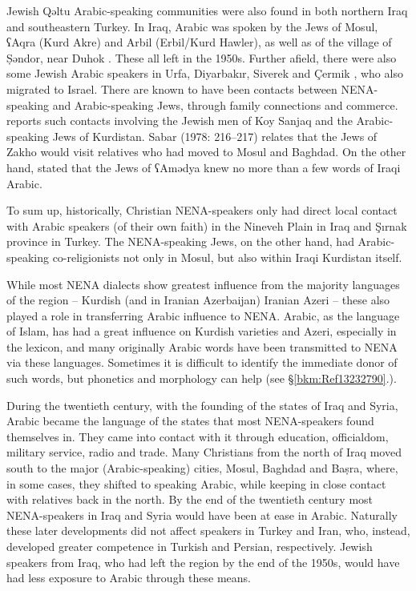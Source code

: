 \documentclass[output=paper]{langsci/langscibook}
\begin{document}
Jewish Qəltu Arabic-speaking communities were also found in both northern Iraq and southeastern Turkey. In Iraq, Arabic was spoken by the Jews of Mosul, ʕAqra (Kurd Akre) and Arbil (Erbil/Kurd Hawler), as well as of the village of Ṣəndor, near Duhok \citep[9]{Hoberman1989}. These all left in the 1950s. Further afield, there were also some Jewish Arabic speakers in Urfa, Diyarbakır, Siverek and Çermik \citep[4]{Jastrow1978}, who also migrated to Israel. There are known to have been contacts between NENA-speaking and Arabic-speaking Jews, through family connections and commerce. \citet[6]{Mutzafi2004} reports such contacts involving the Jewish men of Koy Sanjaq and the Arabic-speaking Jews of Kurdistan. Sabar (1978: 216–217) relates that the Jews of Zakho would visit relatives who had moved to Mosul and Baghdad. On the other hand, \citet[9]{Hoberman1989} stated that the Jews of ʕAmədya knew no more than a few words of Iraqi Arabic.

To sum up, historically, Christian NENA-speakers only had direct local contact with Arabic speakers (of their own faith) in the Nineveh Plain in Iraq and Şırnak province in Turkey. The NENA-speaking Jews, on the other hand, had Arabic-speaking co-religionists not only in Mosul, but also within Iraqi Kurdistan itself.

While most NENA dialects show greatest influence from the majority languages of the region – Kurdish (and in Iranian Azerbaijan) Iranian Azeri – these also played a role in transferring Arabic influence to NENA. Arabic, as the language of Islam, has had a great influence on Kurdish varieties and Azeri, especially in the lexicon, and many originally Arabic words have been transmitted to NENA via these languages. Sometimes it is difficult to identify the immediate donor of such words, but phonetics and morphology can help (see §\ref{bkm:Ref13232790}.).

During the twentieth century, with the founding of the states of Iraq and Syria, Arabic became the language of the states that most NENA-speakers found themselves in. They came into contact with it through education, officialdom, military service, radio and trade. Many Christians from the north of Iraq moved south to the major (Arabic-speaking) cities, Mosul, Baghdad and Baṣra, where, in some cases, they shifted to speaking Arabic, while keeping in close contact with relatives back in the north. By the end of the twentieth century most NENA-speakers in Iraq and Syria would have been at ease in Arabic. Naturally these later developments did not affect speakers in Turkey and Iran, who, instead, developed greater competence in Turkish and Persian, respectively. Jewish speakers from Iraq, who had left the region by the end of the 1950s, would have had less exposure to Arabic through these means.
\end{document}
